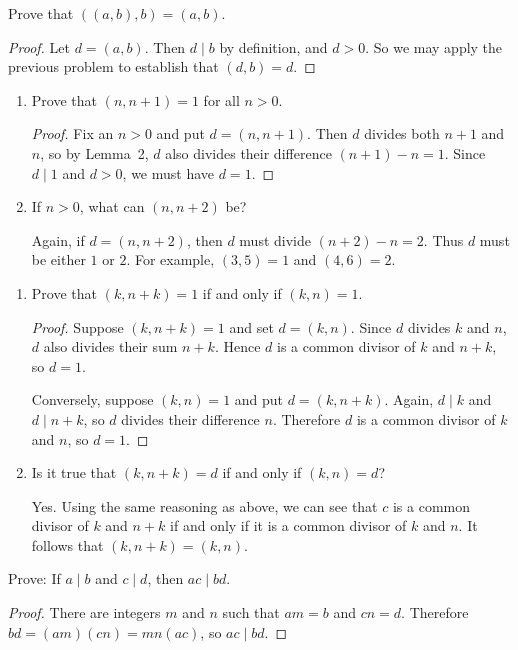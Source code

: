  Prove that $((a,b), b) = (a,b)$.
\begin{proof}
  Let $d = (a,b)$. Then $d\mid b$ by definition, and $d > 0$. So we
  may apply the previous problem to establish that $(d,b) = d$.
\end{proof}

\begin{enumerate}
\item Prove that $(n, n + 1) = 1$ for all $n > 0$.
  \begin{proof}
    Fix an $n>0$ and put $d = (n, n+1)$. Then $d$ divides both $n+1$
    and $n$, so by Lemma~2, $d$ also divides their difference
    $(n + 1) - n = 1$. Since $d\mid1$ and $d > 0$, we must have
    $d = 1$.
  \end{proof}
\item If $n > 0$, what can $(n, n+2)$ be?
  \begin{solution}
    Again, if $d = (n, n+2)$, then $d$ must divide $(n+2) - n =
    2$. Thus $d$ must be either $1$ or $2$. For example, $(3,5) = 1$
    and $(4,6) = 2$.
  \end{solution}
\end{enumerate}

\begin{enumerate}
\item Prove that $(k, n + k) = 1$ if and only if $(k,n) = 1$.
  \begin{proof}
    Suppose $(k, n + k) = 1$ and set $d = (k,n)$. Since $d$ divides
    $k$ and $n$, $d$ also divides their sum $n + k$. Hence $d$ is a
    common divisor of $k$ and $n + k$, so $d = 1$.

    Conversely, suppose $(k,n) = 1$ and put $d = (k, n + k)$. Again,
    $d\mid k$ and $d\mid n+k$, so $d$ divides their difference
    $n$. Therefore $d$ is a common divisor of $k$ and $n$, so $d = 1$.
  \end{proof}
\item Is it true that $(k, n+k) = d$ if and only if $(k,n) = d$?
  \begin{solution}
    Yes. Using the same reasoning as above, we can see that $c$ is a
    common divisor of $k$ and $n + k$ if and only if it is a common
    divisor of $k$ and $n$. It follows that $(k, n+k) = (k,n)$.
  \end{solution}
\end{enumerate}

 Prove: If $a\mid b$ and $c\mid d$, then $ac\mid bd$.
\begin{proof}
  There are integers $m$ and $n$ such that $am = b$ and $cn =
  d$. Therefore $bd = (am)(cn) = mn(ac)$, so $ac \mid bd$.
\end{proof}

